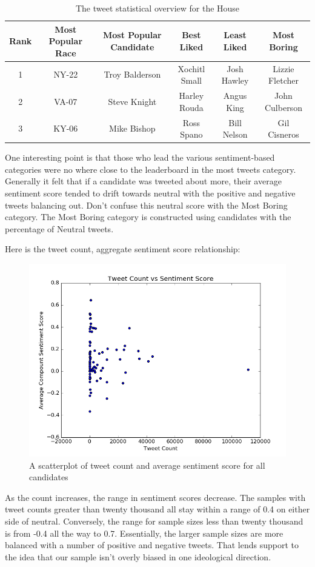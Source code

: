 \documentclass[11pt, twoside, reqno]{book}
\begin{document}
\begin{table}[H]
\centering
\begin{tabular}{ |c|c|c|c|c|c|} 
	\hline
	Rank & Most Popular Race & Most Popular Candidate & Best Liked & Least Liked & Most Boring \\
 	\hline 
	1 & NY-22 & Troy Balderson & Xochitl Small & Josh Hawley & Lizzie Fletcher\\
  	\hline
	2 & VA-07 & Steve Knight & Harley Rouda & Angus King & John Culberson\\ 
	\hline
	3 & KY-06 & Mike Bishop & Ross Spano & Bill Nelson& Gil Cisneros\\
	\hline
\end{tabular}
\caption{The tweet statistical overview for the House}\label{fig:houseleaderboard}
\end{table}

One interesting point is that those who lead the various sentiment-based categories were no where close to the leaderboard in the most tweets category. Generally it felt that if a candidate was tweeted about more, their average sentiment score tended to drift towards neutral with the positive and negative tweets balancing out. Don't confuse this neutral score with the Most Boring category. The Most Boring category is constructed using candidates with the percentage of Neutral tweets. 

Here is the tweet count, aggregate sentiment score relationship: 
\begin{figure}[H]
\centering
	\includegraphics[scale=0.5]{count_sentiment}
	\caption{A scatterplot of tweet count and average sentiment score for all candidates}\label{fig:count_sentiment}
\end{figure}
As the count increases, the range in sentiment scores decrease. The samples with tweet counts greater than twenty thousand all stay within a range of 0.4 on either side of neutral. Conversely, the range for sample sizes less than twenty thousand is from -0.4 all the way to 0.7. Essentially, the larger sample sizes are more balanced with a number of positive and negative tweets. That lends support to the idea that our sample isn't overly biased in one ideological direction. 
\end{document}

